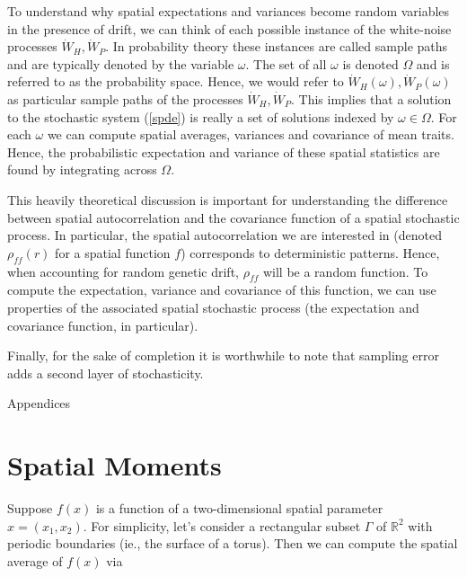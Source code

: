 \documentclass{article}
\begin{document}
To understand why spatial expectations and variances become random
variables in the presence of drift, we can think of each possible
instance of the white-noise processes \(\dot W_H,\dot W_P\). In
probability theory these instances are called sample paths and are
typically denoted by the variable \(\omega\). The set of all \(\omega\)
is denoted \(\Omega\) and is referred to as the probability space.
Hence, we would refer to \(\dot W_H(\omega),\dot W_P(\omega)\) as
particular sample paths of the processes \(\dot W_H,\dot W_P\). This
implies that a solution to the stochastic system (\ref{spde}) is really
a set of solutions indexed by \(\omega\in\Omega\). For each \(\omega\)
we can compute spatial averages, variances and covariance of mean
traits. Hence, the probabilistic expectation and variance of these
spatial statistics are found by integrating across \(\Omega\).

This heavily theoretical discussion is important for understanding the
difference between spatial autocorrelation and the covariance function
of a spatial stochastic process. In particular, the spatial
autocorrelation we are interested in (denoted \(\rho_{ff}(r)\) for a
spatial function \(f\)) corresponds to deterministic patterns. Hence,
when accounting for random genetic drift, \(\rho_{ff}\) will be a random
function. To compute the expectation, variance and covariance of this
function, we can use properties of the associated spatial stochastic
process (the expectation and covariance function, in particular).

Finally, for the sake of completion it is worthwhile to note that
sampling error adds a second layer of stochasticity.

\newpage

\begin{center}
  \Large Appendices
\end{center}

\appendix

\hypertarget{spatial-moments}{%
\section{Spatial Moments}\label{spatial-moments}}

Suppose \(f(x)\) is a function of a two-dimensional spatial parameter
\(x=(x_1,x_2)\). For simplicity, let's consider a rectangular subset
\(\Gamma\) of \(\mathbb R^2\) with periodic boundaries (ie., the surface
of a torus). Then we can compute the spatial average of \(f(x)\) via
\end{document}
